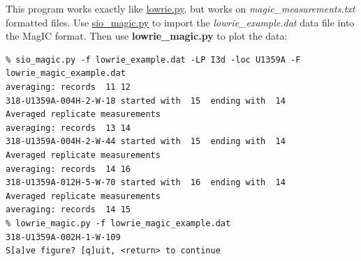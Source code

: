 \documentclass[11pt]{book}
\begin{document}
{{This program works exactly like \href{#lowrie.py}{lowrie.py}, but works on {\it magic\_measurements.txt} formatted files.  Use \href{#sio_magic.py}{sio\_magic.py} to import the {\it lowrie\_example.dat} data file into the MagIC format.  Then use {\bf lowrie\_magic.py} to plot the data:

\begin{verbatim}
% sio_magic.py -f lowrie_example.dat -LP I3d -loc U1359A -F lowrie_magic_example.dat
averaging: records  11 12
318-U1359A-004H-2-W-18 started with  15  ending with  14
Averaged replicate measurements
averaging: records  13 14
318-U1359A-004H-2-W-44 started with  15  ending with  14
Averaged replicate measurements
averaging: records  14 16
318-U1359A-012H-5-W-70 started with  16  ending with  14
Averaged replicate measurements
averaging: records  14 15
% lowrie_magic.py -f lowrie_magic_example.dat
318-U1359A-002H-1-W-109
S[a]ve figure? [q]uit, <return> to continue
\end{verbatim}


}}
\end{document}
